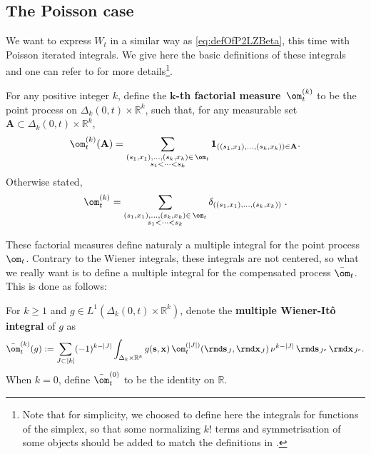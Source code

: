 \subsection{The Poisson case}
We want to express $W_t$ in a similar way as \eqref{eq:defOfP2LZBeta}, this time with Poisson iterated integrals. We give here the basic definitions of these integrals and one can refer to \cite{LastPenrose} for more details\footnote{Note that for simplicity, we choosed to define here the integrals for functions of the simplex, so that some normalizing $k!$ terms and symmetrisation of some objects should be added to match the definitions in \cite{LastPenrose}.}.
\begin{definition}
For any positive integer $k$, define the $\mathbf k$\textbf{-th factorial measure} $\,\om_t^{(k)}$ to be the point process on $\Delta_k(0,t)\times\mathbb{R}^k$, such that, for any measurable set $\mathbf{A}\subset \Delta_k(0,t)\times\mathbb{R}^k$,
\begin{equation}
\om_t^{(k)}(\mathbf{A}) = \sum_{\substack{
(s_1,x_1),\dots,(s_k,x_k) \in\, \om_t\\
s_1<\dots<s_k}} \mathbf{1}_{((s_1,x_1),\dots,(s_k,x_k)) \in \mathbf{A}}.
\end{equation}
Otherwise stated,
\begin{equation}
\om_t^{(k)} = \sum_{\substack{
(s_1,x_1),\dots,(s_k,x_k) \in\, \om_t\\
s_1<\dots<s_k}} \delta_{((s_1,x_1),\dots,(s_k,x_k))}\;.
\end{equation}
\end{definition}
These factorial measures define naturaly a multiple integral for the point process $\om_t$. Contrary to the Wiener integrals, these integrals are not centered, so what we really want is to define a multiple integral for the compensated process $\bar{\om}_t$. This is done as follows:
\begin{definition}
For $k\geq1$ and $g\in L^1(\Delta_k(0,t)\times \mathbb{R}^k)$, denote
the \textbf{multiple Wiener-It\^o integral} of $g$ as
\begin{equation} \label{eq:def_omk}
\bar{\om}^{(k)}_t(g)
:=\sum_{J\subset [k]} (-1)^{k-|J|} \int_{\Delta_k\times \mathbb{R}^k} %
g( \mathbf{s}, \mathbf{x})\, \om_t^{(|J|)}(\rmd \mathbf{s}_J,\rmd \mathbf{x}_J) \, \nu^{k-|J|} \,\rmd \mathbf{s}_{J^c} \, \rmd \mathbf{x}_{J^c}.
\end{equation}
When $k=0$, define $\bar{\om}^{(0)}_t$ to be the identity on $\mathbb{R}$.
\end{definition}

